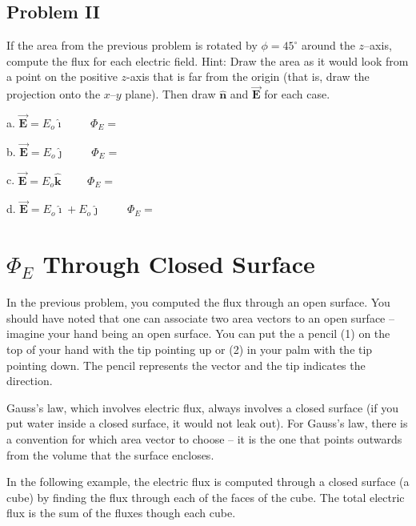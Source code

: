 \documentclass{article}
\newcommand{\ihat}[0]{\hat{\boldsymbol{\imath}}}
\newcommand{\jhat}[0]{\hat{\boldsymbol{\jmath}}}
\newcommand{\khat}[0]{\hat{\boldsymbol{k}}}
\newcommand{\bfvec}[1]{\vec{\mathbf{#1}}}
\begin{document}
\newpage

\subsection{Problem II}



If the area from the previous problem is rotated by $\phi=45^\circ$ around the $z$--axis, compute the flux for each electric field. Hint: Draw the area as it would look from a point on the positive $z$-axis that is far from the origin (that is, draw the projection onto the $x$--$y$ plane). Then draw $\hat{\mathbf{n}}$ and $\bfvec{E}$ for each case.

   a. $\bfvec{E}=E_o\ihat\qquad$ $\Phi_E=$

   b. $\bfvec{E}=E_o\jhat\qquad$ $\Phi_E=$ 

   c. $\bfvec{E}=E_o\khat\qquad$ $\Phi_E=$ 

   d. $\bfvec{E}=E_o\ihat + E_o\jhat\qquad$ $\Phi_E=$

\section{$\Phi_E$ Through Closed Surface}

In the previous problem, you computed the flux through an open surface. You should have noted that one can associate two area vectors to an open surface -- imagine your hand being an open surface. You can put the a pencil (1) on the top of your hand with the tip pointing up or (2) in your palm with the tip pointing down. The pencil represents the vector and the tip indicates the direction.

Gauss's law, which involves electric flux, always involves a closed surface (if you put water inside a closed surface, it would not leak out). For Gauss's law, there is a convention for which area vector to choose -- it is the one that points outwards from the volume that the surface encloses. 

In the following example, the electric flux is computed through a closed surface (a cube) by finding the flux through each of the faces of the cube. The total electric flux is the sum of the fluxes though each cube.

\end{document}
